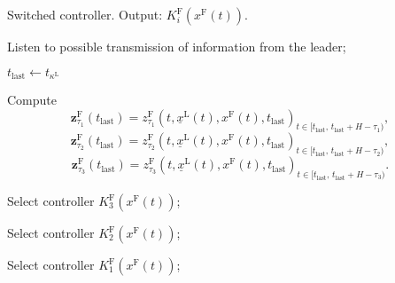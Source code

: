 \documentclass[letterpaper, 10 pt, conference]{ieeeconf}
\theoremstyle{definition}
\theoremstyle{nopoint}
\begin{document}
\begin{algorithm}
\caption{Switched controller. Output:  $K^{\mathrm{F}}_i(x^{\mathrm{F}}(t))$. }\label{alg:switched_controller}
\begin{algorithmic}[1]
\Loop

\State Listen to possible transmission of information from the leader;

 
\State $t_{\mathrm{last}} \leftarrow t_{\kappa^\mathrm{L}}$

\State Compute
\begin{equation}\label{eq:reference_z_F_tau_1}
 \mathbf{z}_{\tau_1}^\mathrm{F}(t_{\mathrm{last}})={z_{\tau_1}^\mathrm{F}(t,\underline{x}^\mathrm{L}(t),x^\mathrm{F}(t),t_{\mathrm{last}})}_{t\in [t_{\mathrm{last}}, \, t_{\mathrm{last}}+H-\tau_1 )},
\end{equation}
\begin{equation}\label{eq:reference_z_F_tau_2}
 \mathbf{z}_{\tau_2}^\mathrm{F}(t_{\mathrm{last}})={z_{\tau_2}^\mathrm{F}(t,\underline{x}^\mathrm{L}(t),x^\mathrm{F}(t),t_{\mathrm{last}})}_{t\in [t_{\mathrm{last}}, \, t_{\mathrm{last}}+H-\tau_2 )},
\end{equation}
\begin{equation}\label{eq:reference_z_F_tau_3}
 \mathbf{z}_{\tau_3}^\mathrm{F}(t_{\mathrm{last}})={z_{\tau_3}^\mathrm{F}(t,\underline{x}^\mathrm{L}(t),x^\mathrm{F}(t),t_{\mathrm{last}})}_{t\in [t_{\mathrm{last}}, \, t_{\mathrm{last}}+H-\tau_3 )}.
\end{equation}



\State Select controller $K^{\mathrm{F}}_3(x^{\mathrm{F}}(t))$;






\State Select controller $K^{\mathrm{F}}_2(x^{\mathrm{F}}(t))$;

\Else

\State Select controller $K^{\mathrm{F}}_1(x^{\mathrm{F}}(t))$;

\EndIf

\EndIf





\EndLoop

\end{algorithmic}
\end{algorithm}
\end{document}

